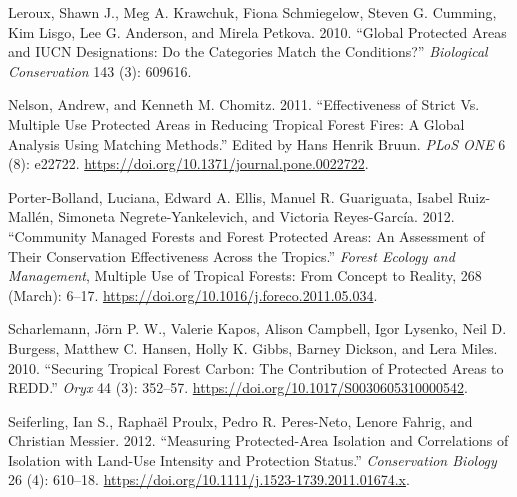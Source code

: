 \documentclass[
  letterpaper,
  DIV=11,
  numbers=noendperiod]{scrartcl}
\newlength{\cslhangindent}
\newlength{\cslentryspacingunit} %
\newenvironment{CSLReferences}[2] %
 {%
  \setlength{\parindent}{0pt}
  \ifodd #1
  \let\oldpar\par
  \def\par{\hangindent=\cslhangindent\oldpar}
  \fi
  \setlength{\parskip}{#2\cslentryspacingunit}
 }%
 {}
\begin{document}
\begin{CSLReferences}{1}{0}
\leavevmode{}%
Leroux, Shawn J., Meg A. Krawchuk, Fiona Schmiegelow, Steven G. Cumming,
Kim Lisgo, Lee G. Anderson, and Mirela Petkova. 2010. {``Global
Protected Areas and IUCN Designations: Do the Categories Match the
Conditions?''} \emph{Biological Conservation} 143 (3): 609616.

\leavevmode{}%
Nelson, Andrew, and Kenneth M. Chomitz. 2011. {``Effectiveness of Strict
Vs. Multiple Use Protected Areas in Reducing Tropical Forest Fires: A
Global Analysis Using Matching Methods.''} Edited by Hans Henrik Bruun.
\emph{PLoS ONE} 6 (8): e22722.
\url{https://doi.org/10.1371/journal.pone.0022722}.

\leavevmode{}%
Porter-Bolland, Luciana, Edward A. Ellis, Manuel R. Guariguata, Isabel
Ruiz-Mallén, Simoneta Negrete-Yankelevich, and Victoria Reyes-García.
2012. {``Community Managed Forests and Forest Protected Areas: An
Assessment of Their Conservation Effectiveness Across the Tropics.''}
\emph{Forest Ecology and Management}, Multiple Use of Tropical Forests:
From Concept to Reality, 268 (March): 6--17.
\url{https://doi.org/10.1016/j.foreco.2011.05.034}.

\leavevmode{}%
Scharlemann, Jörn P. W., Valerie Kapos, Alison Campbell, Igor Lysenko,
Neil D. Burgess, Matthew C. Hansen, Holly K. Gibbs, Barney Dickson, and
Lera Miles. 2010. {``Securing Tropical Forest Carbon: The Contribution
of Protected Areas to REDD.''} \emph{Oryx} 44 (3): 352--57.
\url{https://doi.org/10.1017/S0030605310000542}.

\leavevmode{}%
Seiferling, Ian S., Raphaël Proulx, Pedro R. Peres-Neto, Lenore Fahrig,
and Christian Messier. 2012. {``Measuring Protected-Area Isolation and
Correlations of Isolation with Land-Use Intensity and Protection
Status.''} \emph{Conservation Biology} 26 (4): 610--18.
\url{https://doi.org/10.1111/j.1523-1739.2011.01674.x}.

\end{CSLReferences}
\end{document}
